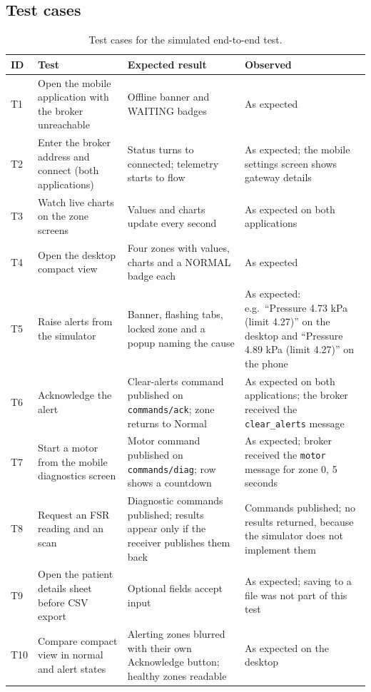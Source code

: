 \subsection{Test cases}
{\small{}
\begin{table}[H]
\centering
\begin{tabularx}{\textwidth}{@{}>{\raggedright\arraybackslash}p{0.9cm}>{\raggedright\arraybackslash}p{3.6cm}>{\raggedright\arraybackslash}p{4.0cm}X@{}}
\toprule
\textbf{ID} & \textbf{Test} & \textbf{Expected result} & \textbf{Observed}\\
\midrule
T1 & Open the mobile application with the broker unreachable & Offline banner and WAITING badges & As expected\\
T2 & Enter the broker address and connect (both applications) & Status turns to connected; telemetry starts to flow & As expected; the mobile settings screen shows gateway details\\
T3 & Watch live charts on the zone screens & Values and charts update every second & As expected on both applications\\
T4 & Open the desktop compact view & Four zones with values, charts and a NORMAL badge each & As expected\\
T5 & Raise alerts from the simulator & Banner, flashing tabs, locked zone and a popup naming the cause & As expected: e.g.\ ``Pressure 4.73 kPa (limit 4.27)'' on the desktop and ``Pressure 4.89 kPa (limit 4.27)'' on the phone\\
T6 & Acknowledge the alert & Clear-alerts command published on \texttt{commands/ack}; zone returns to Normal & As expected on both applications; the broker received the \texttt{clear\_alerts} message\\
T7 & Start a motor from the mobile diagnostics screen & Motor command published on \texttt{commands/diag}; row shows a countdown & As expected; broker received the \texttt{motor} message for zone 0, 5 seconds\\
T8 & Request an FSR reading and an \itwoc{} scan & Diagnostic commands published; results appear only if the receiver publishes them back & Commands published; no results returned, because the simulator does not implement them\\
T9 & Open the patient details sheet before CSV export & Optional fields accept input & As expected; saving to a file was not part of this test\\
T10 & Compare compact view in normal and alert states & Alerting zones blurred with their own Acknowledge button; healthy zones readable & As expected on the desktop\\
\bottomrule
\end{tabularx}
\caption{Test cases for the simulated end-to-end test.}
\end{table}}

